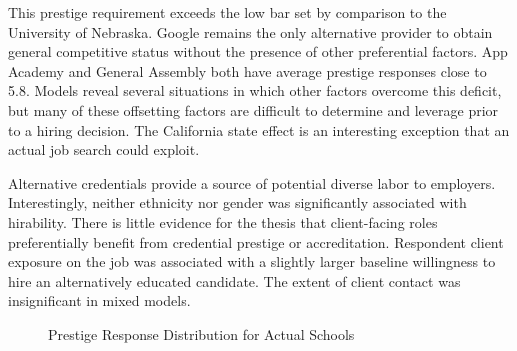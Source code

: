 This prestige requirement exceeds the low bar set by comparison to the University of Nebraska.
Google remains the only alternative provider to obtain general competitive status without the presence of other preferential factors.
App Academy and General Assembly both have average prestige responses close to 5.8.
Models reveal several situations in which other factors overcome this deficit,
but many of these offsetting factors are difficult to determine and leverage prior to a hiring decision.
The California state effect is an interesting exception that an actual job search could exploit.

Alternative credentials provide a source of potential diverse labor to employers.
Interestingly, neither ethnicity nor gender was significantly associated with hirability.
There is little evidence for the thesis that client-facing roles preferentially benefit from credential prestige or accreditation.
Respondent client exposure on the job was associated with a slightly larger baseline willingness to hire an alternatively educated candidate.
The extent of client contact was insignificant in mixed models.

\begin{figure}[h!]
    \centering
    \caption{Prestige Response Distribution for Actual Schools}
    \label{fig:var_results}
\end{figure}

